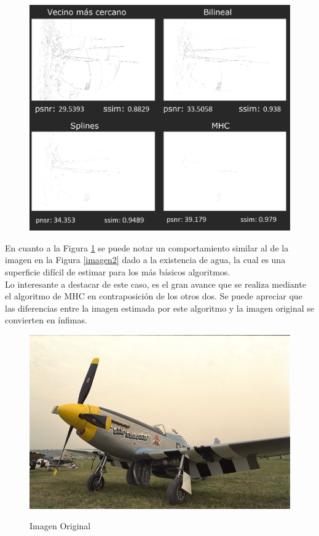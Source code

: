 \documentclass[a4paper]{article}
\begin{document}
\begin{figure}[h!]
    \caption{}
    \begin{center}
    \includegraphics[scale=0.40]{imagenes/comparacion/05/collage}
    \label{imagen5}
  \end{center}
\end{figure}


En cuanto a la Figura \ref{imagen5} se puede notar un comportamiento similar al de la imagen en la Figura \ref{imagen2} dado a la existencia de agua, la cual es una superficie dif\'icil de estimar para los m\'as b\'asicos algoritmos.\\

Lo interesante a destacar de este caso, es el gran avance que se realiza mediante el algoritmo de MHC en contraposici\'on de los otros dos. Se puede apreciar que las diferencias entre la imagen estimada por este algoritmo y la imagen original se convierten en \'infimas.


\newpage

\begin{figure}[h!]
    \caption{Imagen Original}
    \begin{center}
    \includegraphics[scale=0.15]{imagenes/comparacion/09/img9}
    \label{imgOri2}
  \end{center}
\end{figure}
\end{document}
